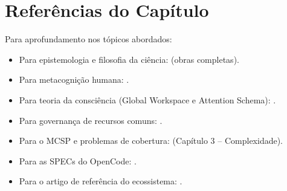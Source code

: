 \section*{Referências do Capítulo}

Para aprofundamento nos tópicos abordados:
\begin{itemize}
\item Para epistemologia e filosofia da ciência: \cite{popper2005logica,
kuhn1998estrutura} (obras completas).
\item Para metacognição humana: \cite{flavell1976metacognitive,
schraw2006metacognitive, metzinger2020minimal}.
\item Para teoria da consciência (Global Workspace e Attention Schema):
\cite{baars1988cognitive, graziano2013consciousness}.
\item Para governança de recursos comuns: \cite{ostrom1990governing}.
\item Para o MCSP e problemas de cobertura: \cite{russell2020inteligencia}
(Capítulo 3 -- Complexidade).
\item Para as SPECs do OpenCode: \cite{opencode2026scanner,
opencode2026spec036, opencode2026spec038}.
\item Para o artigo de referência do ecossistema: \cite{laranjeira2026opencode}.
\end{itemize}

